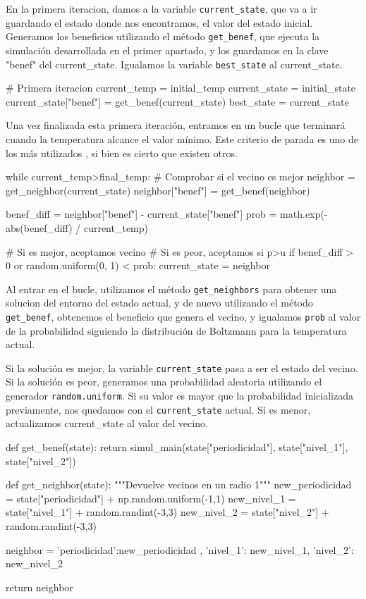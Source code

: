 \documentclass[a4paper,12pt]{article}
\begin{document}
	En la primera iteracion, damos a la variable \texttt{current\_state}, que va a ir guardando el estado donde nos encontramos, el valor del estado inicial.
	Generamos los beneficios utilizando el método \texttt{get\_benef}, que ejecuta la simulación desarrollada en el primer apartado, y los guardamos en la clave
	"benef" del current\_state. Igualamos la variable \texttt{best\_state} al current\_state.

	\begin{python}
	# Primera iteracion
	current_temp = initial_temp
	current_state = initial_state
	current_state["benef"] = get_benef(current_state)
	best_state = current_state
	\end{python}			

	Una vez finalizada esta primera iteración, entramos en un bucle que terminará cuando la temperatura alcance el valor mínimo. Este criterio de parada es uno de los más utilizados \cite{tfm}, si bien es cierto que existen otros.

	\begin{python}	
while current_temp>final_temp:
	# Comprobar si el vecino es mejor
	neighbor = get_neighbor(current_state)
	neighbor["benef"] = get_benef(neighbor)

	benef_diff = neighbor["benef"] - current_state["benef"]
	prob = math.exp(-abs(benef_diff) / current_temp)

	# Si es mejor, aceptamos vecino
	# Si es peor, aceptamos si p>u
	if benef_diff > 0 or random.uniform(0, 1) < prob:
		current_state = neighbor
	\end{python}	

	Al entrar en el bucle, utilizamos el método \texttt{get\_neighbors} para obtener una solucion del entorno del estado actual, y de nuevo utilizando el método \texttt{get\_benef}, obtenemos el beneficio que genera el vecino, y igualamos \texttt{prob} al valor de la probabilidad siguiendo la distribución de Boltzmann para la temperatura actual. 
	
	Si la solución es mejor, la variable \texttt{current\_state} pasa a ser el estado del vecino.
	Si la solución es peor, generamos una probabilidad aleatoria utilizando el generador \texttt{random.uniform}. Si su valor es mayor que la probabilidad inicializada previamente,
	nos quedamos con el \texttt{current\_state} actual. Si es menor, actualizamos current\_state al valor del vecino.

	\begin{python}	
def get_benef(state):
  		return simul_main(state["periodicidad"],
  		                  state["nivel_1"], state["nivel_2"])

def get_neighbor(state):
	"""Devuelve vecinos en un radio 1"""
	new_periodicidad = state["periodicidad"] +  np.random.uniform(-1,1)
	new_nivel_1 = state["nivel_1"] +  random.randint(-3,3)
	new_nivel_2 = state["nivel_2"] +  random.randint(-3,3)

	neighbor = {'periodicidad':new_periodicidad ,  
					'nivel_1': new_nivel_1,
					'nivel_2': new_nivel_2 }

	return neighbor
	\end{python}		
\end{document}
